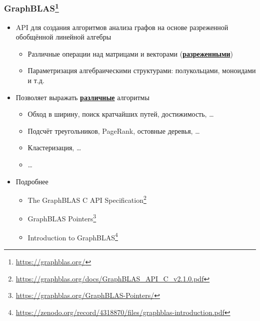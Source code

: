\documentclass[xcolor=table,aspectratio=169]{beamer}
\begin{document}
\begin{frame}[fragile]
  \frametitle{GraphBLAS\footnote{\url{https://graphblas.org/}}}
  \begin{itemize}
    \item API для создания алгоритмов анализа графов на основе разреженной обобщённой линейной алгебры 
    \begin{itemize}
      \item Различные операции над матрицами и векторами (\underline{\textbf{разреженными}})
      \item Параметризация алгебраическими структурами: полукольцами, моноидами и т.д.
    \end{itemize}
    \pause
    \item Позволяет выражать \underline{\textbf{различные}} алгоритмы
    \begin{itemize}
      \item Обход в ширину, поиск кратчайших путей, достижимость, \ldots
      \item Подсчёт треугольников, PageRank, остовные деревья, \ldots
      \item Кластеризация, \ldots
      \item \ldots
    \end{itemize}
    \pause
    \item Подробнее
    \begin{itemize}
      \item The GraphBLAS C API Specification\footnote{\url{https://graphblas.org/docs/GraphBLAS_API_C_v2.1.0.pdf}}
      \item GraphBLAS Pointers\footnote{\url{https://graphblas.org/GraphBLAS-Pointers/}}
      \item Introduction to GraphBLAS\footnote{\url{https://zenodo.org/record/4318870/files/graphblas-introduction.pdf}}
    \end{itemize}
    \end{itemize}
\end{frame}
\end{document}
